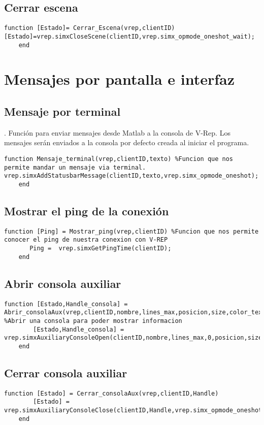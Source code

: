 \subsection{Cerrar escena}
\begin{lstlisting}[frame=single]
function [Estado]= Cerrar_Escena(vrep,clientID)     [Estado]=vrep.simxCloseScene(clientID,vrep.simx_opmode_oneshot_wait);
    end
\end{lstlisting}
\section{Mensajes por pantalla e interfaz}
\subsection{Mensaje por terminal}.
Función para enviar mensajes desde Matlab a la consola de V-Rep.
Los mensajes serán enviados a la consola por defecto creada al iniciar el programa.
\begin{lstlisting}[frame=single]
function Mensaje_terminal(vrep,clientID,texto) %Funcion que nos permite mandar un mensaje via terminal.       vrep.simxAddStatusbarMessage(clientID,texto,vrep.simx_opmode_oneshot);
    end
\end{lstlisting}
\subsection{Mostrar el ping de la conexión}
\begin{lstlisting}[frame=single]
function [Ping] = Mostrar_ping(vrep,clientID) %Funcion que nos permite conocer el ping de nuestra conexion con V-REP
       Ping =  vrep.simxGetPingTime(clientID);
    end
\end{lstlisting}
\subsection{Abrir consola auxiliar}
\begin{lstlisting}[frame=single]
function [Estado,Handle_consola] = Abrir_consolaAux(vrep,clientID,nombre,lines_max,posicion,size,color_texto,color_fondo) %Abrir una consola para poder mostrar informacion
        [Estado,Handle_consola] = vrep.simxAuxiliaryConsoleOpen(clientID,nombre,lines_max,0,posicion,size,color_texto,color_fondo,vrep.simx_opmode_oneshot_wait);
    end
\end{lstlisting}
\subsection{Cerrar consola auxiliar}
\begin{lstlisting}[frame=single]
function [Estado] = Cerrar_consolaAux(vrep,clientID,Handle) 
        [Estado] = vrep.simxAuxiliaryConsoleClose(clientID,Handle,vrep.simx_opmode_oneshot);
    end
\end{lstlisting}
